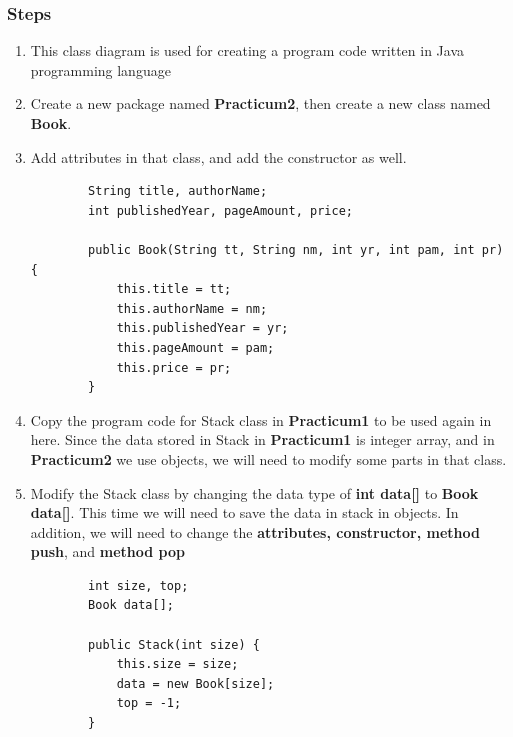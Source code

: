 \documentclass[12pt,titlepage]{article}
\begin{document}
\subsubsection{Steps}
\begin{enumerate}
    \item This class diagram is used for creating a program code written in Java programming language
    \mbox{}\\
    \item Create a new package named \textbf{Practicum2}, then create a new class named \textbf{Book}.
    \item Add attributes in that class, and add the constructor as well.
    \begin{verbatim}
        String title, authorName;
        int publishedYear, pageAmount, price;

        public Book(String tt, String nm, int yr, int pam, int pr) {
            this.title = tt;
            this.authorName = nm;
            this.publishedYear = yr;
            this.pageAmount = pam;
            this.price = pr;
        }
    \end{verbatim}
    \item Copy the program code for Stack class in \textbf{Practicum1} to be used again in here. Since the data stored in Stack in \textbf{Practicum1} is integer array, and in \textbf{Practicum2} we use objects, we will need to modify some parts in that class.
    \item Modify the Stack class by changing the data type of \textbf{int data[]} to \textbf{Book data[]}. This time we will need to save the data in stack in objects. In addition, we will need to change the \textbf{attributes, constructor, method push}, and \textbf{method pop}
    \begin{verbatim}
        int size, top;
        Book data[];

        public Stack(int size) {
            this.size = size;
            data = new Book[size];
            top = -1;
        }


\end{verbatim}
\end{enumerate}
\end{document}
